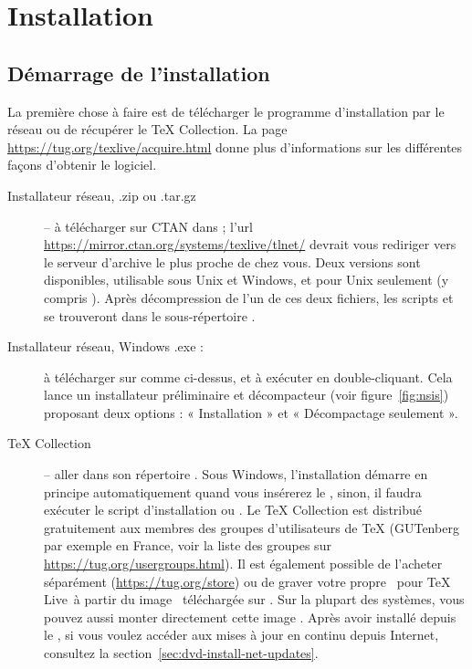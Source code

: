 \documentclass[german, english, french]{article}
\renewcommand{\TL}{\TeX{} Live\xspace}%
\renewcommand{\TK}{\TeX{} Collection\xspace}%
\begin{document}
\section{Installation}
\label{sec:install}

\subsection{Démarrage de l'installation}
\label{sec:inst_start}

La première chose à faire est de télécharger le programme d'installation par le
réseau ou de récupérer le \DVD{} \TK.  La page
\url{https://tug.org/texlive/acquire.html} donne plus d'informations sur les
différentes façons d'obtenir le logiciel.

\begin{description}
\item[Installateur réseau, .zip ou .tar.gz] -- à télécharger sur CTAN dans
   ; l'url
  \url{https://mirror.ctan.org/systems/texlive/tlnet/} devrait vous rediriger vers
  le serveur d'archive le plus proche de chez vous.  Deux versions sont
  disponibles,  utilisable sous Unix et Windows, et
   pour Unix seulement (y compris \macOS). Après
  décompression de l'un de ces deux fichiers, les scripts 
  et  se trouveront dans le sous-répertoire
  .

\item[Installateur réseau, Windows .exe :] à télécharger sur \CTAN{} comme
  ci-dessus, et à exécuter en double-cliquant. Cela lance un installateur
  préliminaire et décompacteur (voir figure~\ref{fig:nsis}) proposant deux
  options : « Installation » et « Décompactage seulement ».

\item[\DVD \TK{}] -- aller dans son répertoire .  Sous Windows,
  l'installation démarre en principe automatiquement quand vous insérerez le
  \DVD, sinon, il faudra exécuter le script d'installation 
  ou .  Le \DVD \TK{} est distribué gratuitement aux
  membres des groupes d'utilisateurs de \TeX{} (GUTenberg par exemple en France,
  voir la liste des groupes sur \url{https://tug.org/usergroups.html}). Il est
  également possible de l'acheter séparément (\url{https://tug.org/store}) ou de
  graver votre propre \DVD\ pour \TL\ à partir du image \ISO\ téléchargée sur
  \CTAN. Sur la plupart des systèmes, vous pouvez aussi monter directement cette
  image \ISO.  Après avoir installé depuis le \DVD{}, si vous voulez accéder aux
  mises à jour en continu depuis Internet, consultez la
  section~\ref{sec:dvd-install-net-updates}.
\end{description}
\end{document}
